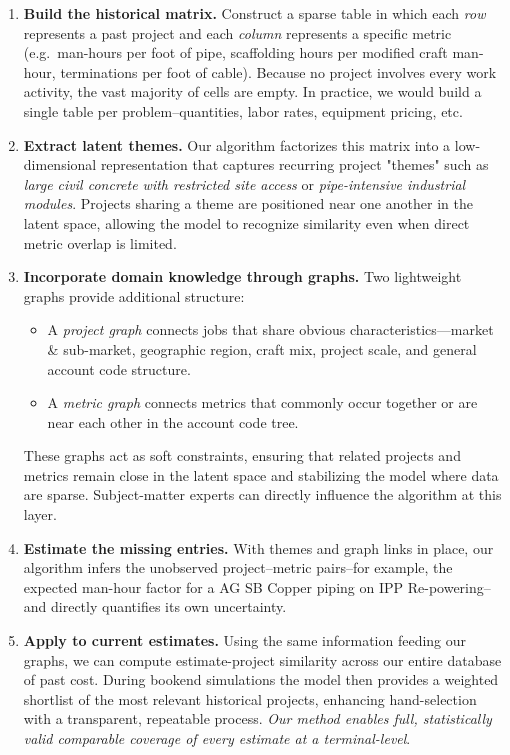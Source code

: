 \documentclass[12pt, a4paper]{article} %
\begin{document}
\begin{enumerate}
  \item \textbf{Build the historical matrix.}  
        Construct a sparse table in which each \emph{row} represents a past project and each \emph{column} represents a specific metric (e.g.\ man-hours per foot of pipe, scaffolding hours per modified craft man-hour, terminations per foot of cable). Because no project involves every work activity, the vast majority of cells are empty. In practice, we would build a single table per problem--quantities, labor rates, equipment pricing, etc.

  \item \textbf{Extract latent themes.}  
        Our algorithm factorizes this matrix into a low-dimensional representation that captures recurring project "themes" such as \emph{large civil concrete with restricted site access} or \emph{pipe-intensive industrial modules}. Projects sharing a theme are positioned near one another in the latent space, allowing the model to recognize similarity even when direct metric overlap is limited.

  \item \textbf{Incorporate domain knowledge through graphs.}  
        Two lightweight graphs provide additional structure:
        \begin{itemize}
          \item A \emph{project graph} connects jobs that share obvious
                characteristics—market \& sub-market, geographic region, craft mix,
                project scale, and general account code structure.
          \item A \emph{metric graph} connects metrics that commonly
                occur together or are near each other in the account code tree.
        \end{itemize}
        These graphs act as soft constraints, ensuring that related projects and metrics remain close in the latent space and stabilizing the model where data are sparse. Subject-matter experts can directly influence the algorithm at this layer.

  \item \textbf{Estimate the missing entries.}  
        With themes and graph links in place, our algorithm infers the unobserved project–metric pairs--for example, the expected man-hour factor for a AG SB Copper piping on IPP Re-powering--and directly quantifies its own uncertainty.

  \item \textbf{Apply to current estimates.}  
        Using the same information feeding our graphs, we can compute estimate-project similarity across our entire database of past cost. During bookend simulations the model then provides a weighted shortlist of the most relevant historical projects, enhancing hand-selection with a transparent, repeatable process. \emph{Our method enables full, statistically valid comparable coverage of every estimate at a terminal-level}.
\end{enumerate}
\end{document}
